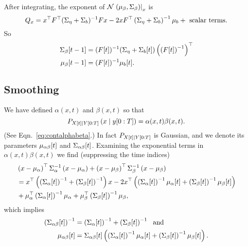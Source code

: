 After integrating, the exponent of
${\mathcal{N}}\left.\left(\mu_\beta,\Sigma_\beta\right)\right|_{x}$ is
\begin{equation*}
  Q_x = x^\top F^\top (\Sigma_\eta + \Sigma_b)^{-1} Fx - 2x
  F^\top \left(\Sigma_\eta + \Sigma_b \right)^{-1}\mu_b +
  \text{ scalar terms}. 
\end{equation*}
So
\begin{align*}
  {\Sigma_\beta}{[t-1]} &= ({F}{[t]})^{-1} ( \Sigma_\eta +
  {\Sigma_b}{[t]} ) \left( \left( {F}{[t]} \right)^{-1}
  \right)^\top
  \\
  {\mu_\beta}{[t-1]} &= ({F}{[t]})^{-1}{\mu_b}{[t]}.
\end{align*}

\subsection{Smoothing}
\label{sec:DetailSmoothing}

We have defined $\alpha(x,t)$ and $\beta(x,t)$ so that
\begin{equation*}
   P_{{X}{[t]}\mid Y[0:T]} \left(x\mid y[0:T] \right) =
   \alpha(x,t) \beta(x,t).
\end{equation*}
(See Eqn.~\eqref{eq:contalphabeta}.)  In fact
$P_{{X}{[t]}\mid Y[0:T]}$ is Gaussian, and we denote its parameters
${\mu_{\alpha \beta}}{[t]}$ and ${\Sigma_{\alpha \beta}}{[t]}$.
Examining the exponential terms in $\alpha(x,t) \beta(x,t)$ we find
(suppressing the time indices)
\begin{align*}
  &\left( x - \mu_\alpha \right)^\top \Sigma_\alpha^{-1} \left( x
    - \mu_\alpha \right) + \left( x - \mu_\beta \right)^\top
  \Sigma_\beta^{-1} \left( x - \mu_\beta \right)\\
  & = x^\top \left( \left( {\Sigma_{\alpha}}{[t]} \right)^{-1} + \left(
      {\Sigma_{\beta}}{[t]} \right)^{-1} \right) x - 2x^\top
  \left( \left( {\Sigma_{\alpha}}{[t]} \right)^{-1}
  {\mu_{\alpha}}{[t]} + \left( {\Sigma_{\beta}}{[t]} \right)^{-1}
  {\mu_{\beta}}{[t]} \right) \\
& + \mu_\alpha^\top  \left(
  {\Sigma_{\alpha}}{[t]} \right)^{-1} \mu_\alpha +
  \mu_\beta^\top  \left( {\Sigma_{\beta}}{[t]} \right)^{-1}
  \mu_\beta ,
\end{align*}
which implies
\begin{subequations}
  \begin{align}
    \left( {\Sigma_{\alpha \beta}}{[t]} \right)^{-1} &= \left(
      {\Sigma_{\alpha}}{[t]} \right)^{-1} + \left(
      {\Sigma_{\beta}}{[t]} \right)^{-1} ~\text{ and} \\
    {\mu_{\alpha \beta}}{[t]} &=
    {\Sigma_{\alpha \beta}}{[t]} \left( \left(
        {\Sigma_{\alpha}}{[t]} \right)^{-1} {\mu_{\alpha}}{[t]} +
      \left( {\Sigma_{\beta}}{[t]} \right)^{-1} {\mu_{\beta}}{[t]}
    \right).
\end{align}
\end{subequations}

